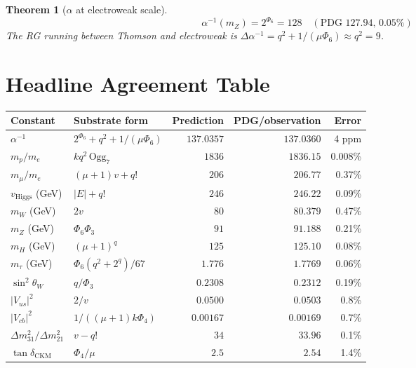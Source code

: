 \documentclass[11pt]{article}
\newtheorem{theorem}{Theorem}
\begin{document}
\begin{theorem}[$\alpha$ at electroweak scale]\label{thm:alpha_mZ}
\[
  \alpha^{-1}(m_Z) = 2^{\Phi_6} = 128 \quad (\text{PDG 127.94, 0.05\%})
\]
The RG running between Thomson and electroweak is
$\Delta\alpha^{-1} = q^2 + 1/(\mu\Phi_6) \approx q^2 = 9$.
\end{theorem}

\section{Headline Agreement Table}

\begin{center}\small\begin{tabular}{llrrr}
\toprule
\textbf{Constant} & \textbf{Substrate form} & \textbf{Prediction} & \textbf{PDG/observation} & \textbf{Error} \\
\midrule
$\alpha^{-1}$               & $2^{\Phi_6}+q^2+1/(\mu\Phi_6)$ & $137.0357$ & $137.0360$ & 4 ppm \\
$m_p/m_e$                   & $k q^2\,\mathrm{Ogg}_7$        & $1836$    & $1836.15$ & 0.008\% \\
$m_\mu/m_e$                 & $(\mu+1)v + q!$                & $206$     & $206.77$  & 0.37\% \\
$v_{\mathrm{Higgs}}$ (GeV)  & $|E| + q!$                      & $246$     & $246.22$  & 0.09\% \\
$m_W$ (GeV)                 & $2v$                            & $80$      & $80.379$  & 0.47\% \\
$m_Z$ (GeV)                 & $\Phi_6 \Phi_3$                 & $91$      & $91.188$  & 0.21\% \\
$m_H$ (GeV)                 & $(\mu+1)^q$                     & $125$     & $125.10$  & 0.08\% \\
$m_\tau$ (GeV)              & $\Phi_6(q^2+2^q)/67$           & $1.776$   & $1.7769$  & 0.06\% \\
$\sin^2\theta_W$            & $q/\Phi_3$                       & $0.2308$  & $0.2312$  & 0.19\% \\
$|V_{us}|^2$                & $2/v$                            & $0.0500$  & $0.0503$  & 0.8\% \\
$|V_{cb}|^2$                & $1/((\mu+1)k\Phi_4)$            & $0.00167$ & $0.00169$ & 0.7\% \\
$\Delta m^2_{31}/\Delta m^2_{21}$ & $v - q!$                  & $34$      & $33.96$   & 0.1\% \\
$\tan\delta_{\mathrm{CKM}}$ & $\Phi_4/\mu$                    & $2.5$     & $2.54$    & 1.4\% \\

\end{tabular}
\end{center}
\end{document}
